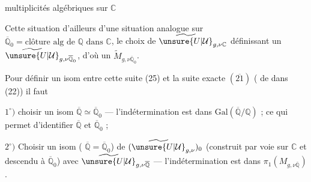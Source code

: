 

multiplicités algébriques sur $\mathbb C$


Cette situation  d'ailleurs  d'une situation analogue sur $\overline{\mathbb Q}_0=\text{clôture alg de }\mathbb Q\text{ dans }\mathbb C$, le choix de $\widetilde{\unsure{U|\mathcal{U}}}_{g,\nu\mathbb C}$ définissant un $\widetilde{\unsure{U|\mathcal{U}}}_{g,\nu\overline{\mathbb Q}_0}$, d'où un $\widetilde{M}_{g,\nu\overline{\mathbb Q}_0}$.

Pour définir un isom entre cette suite (25) et la suite exacte $(\overline{21})$  ( de  dans (22)) il faut

$1^{\circ})$ choisir un isom $\overline{\mathbb Q}\simeq\overline{\mathbb Q}_0$ --- l'indétermination est dans $\mathrm{Gal}(\overline{\mathbb Q}/\mathbb Q)$ ; ce qui permet d'identifier $\overline{\mathbb Q}$ et $\overline{\mathbb Q}_0$ ;

$2^{\circ})$ Choisir un isom ( $\overline{\mathbb Q}=\overline{\mathbb Q}_0$) de $(\widetilde{\unsure{U|\mathcal{U}}}_{g,\nu})_0$ (construit par voie  sur $\mathbb C$ et descendu à $\overline{\mathbb Q}_0$) avec $\widetilde{\unsure{U|\mathcal{U}}}_{g,\nu\overline{\mathbb Q}}$ --- l'indétermination est dans $\pi_1(M_{g,\nu\overline{\mathbb Q}})$.

